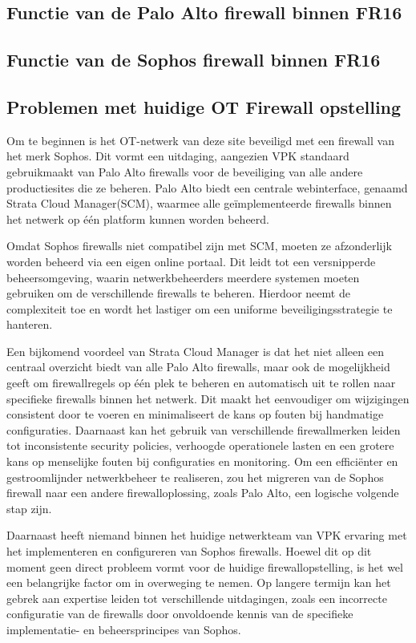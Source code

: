 \subsection{Functie van de Palo Alto firewall binnen FR16}
\subsection{Functie van de Sophos firewall binnen FR16}

\subsection{Problemen met huidige OT Firewall opstelling}
Om te beginnen is het OT-netwerk van deze site beveiligd met een firewall van het merk Sophos. Dit vormt een uitdaging, aangezien VPK standaard gebruikmaakt van Palo Alto firewalls voor de beveiliging van alle andere productiesites die ze beheren. Palo Alto biedt een centrale webinterface, genaamd Strata Cloud Manager(SCM), waarmee alle geïmplementeerde firewalls binnen het netwerk op één platform kunnen worden beheerd.

Omdat Sophos firewalls niet compatibel zijn met SCM, moeten ze afzonderlijk worden beheerd via een eigen online portaal. Dit leidt tot een versnipperde beheersomgeving, waarin netwerkbeheerders meerdere systemen moeten gebruiken om de verschillende firewalls te beheren. Hierdoor neemt de complexiteit toe en wordt het lastiger om een uniforme beveiligingsstrategie te hanteren.

Een bijkomend voordeel van Strata Cloud Manager is dat het niet alleen een centraal overzicht biedt van alle Palo Alto firewalls, maar ook de mogelijkheid geeft om firewallregels op één plek te beheren en automatisch uit te rollen naar specifieke firewalls binnen het netwerk. Dit maakt het eenvoudiger om wijzigingen consistent door te voeren en minimaliseert de kans op fouten bij handmatige configuraties.
Daarnaast kan het gebruik van verschillende firewallmerken leiden tot inconsistente security policies, verhoogde operationele lasten en een grotere kans op menselijke fouten bij configuraties en monitoring. Om een efficiënter en gestroomlijnder netwerkbeheer te realiseren, zou het migreren van de Sophos firewall naar een andere firewalloplossing, zoals Palo Alto, een logische volgende stap zijn.

Daarnaast heeft niemand binnen het huidige netwerkteam van VPK ervaring met het implementeren en configureren van Sophos firewalls. Hoewel dit op dit moment geen direct probleem vormt voor de huidige firewallopstelling, is het wel een belangrijke factor om in overweging te nemen. Op langere termijn kan het gebrek aan expertise leiden tot verschillende uitdagingen, zoals een incorrecte configuratie van de firewalls door onvoldoende kennis van de specifieke implementatie- en beheersprincipes van Sophos.

